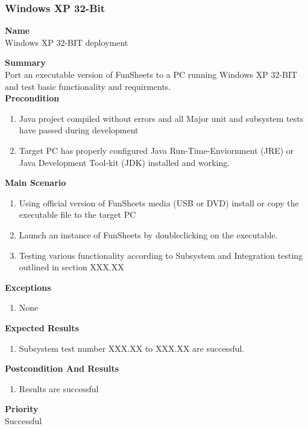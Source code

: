 \documentclass[12pt]{article}
\begin{document}
\subsubsection{Windows XP 32-Bit} \label{uc:1}

\noindent
{\bf Name}\\
Windows XP 32-BIT deployment

\noindent
{\bf Summary}\\
Port an executable version of FunSheets to a PC running Windows XP 32-BIT and test basic functionality and requirments.
\noindent\\
{\bf Precondition}\
\begin{enumerate}
\item Java project compiled without errors and all Major unit and subsystem tests have passed during development
\item Target PC has properly configured Java Run-Time-Enviornment (JRE) or Java Development Tool-kit (JDK) installed and working.
\end{enumerate}

\noindent
{\bf Main Scenario}\
\vspace*{-0.2in}
\begin{enumerate}
\item Using official version of FunSheets media (USB or DVD) install or copy the executable file to the target PC
\item Launch an instance of FunSheets by doubleclicking on the executable.
\item Testing various functionality according to Subsystem and Integration testing outlined in section XXX.XX
\end{enumerate}

{\bf Exceptions}\
\begin{enumerate}
\item None
\end{enumerate}
{\bf Expected Results}\
\begin{enumerate}
\item Subsystem test number XXX.XX to XXX.XX are successful.
\end{enumerate}

{\bf Postcondition And Results}\
\begin{enumerate}
\item Results are successful
\end{enumerate}

\noindent
{\bf Priority}\\
Successful
\noindent
\end{document}
